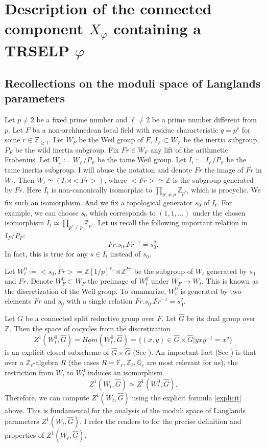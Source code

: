 \documentclass{article}
\begin{document}
	
	\section{Description of the connected component $X_{\varphi}$ containing a TRSELP $\varphi$}
	
	\subsection{Recollections on the moduli space of Langlands parameters}
	
	Let $p \neq 2$ be a fixed prime number and $\ell \neq 2$ be a prime number different from $p$. Let $F$ ba a non-archimedean local field with residue characteristic $q=p^r$ for some $r \in \mathbb{Z}_{\geq 1}$. Let $W_F$ be the Weil group of $F$, $I_F \subset W_F$ be the inertia subgroup, $P_F$ be the wild inertia subgroup. Fix $Fr \in W_F$ any lift of the arithmetic Frobenius. Let $W_t:=W_F/P_F$ be the tame Weil group. Let $I_t:=I_F/P_F$ be the tame inertia subgroup. I will abuse the notation and denote $Fr$ the image of $Fr$ in $W_t$. Then $W_t \simeq (I_t \rtimes <Fr>)$, where $<Fr> \simeq \mathbb{Z}$ is the subgroup generated by $Fr$. Here $I_t$ is non-canonically isomorphic to $\prod_{p'\neq p}\mathbb{Z}_{p'}$, which is procyclic. We fix such an isomorphism. And we fix a topological generator $s_0$ of $I_t$. For example, we can choose $s_0$ which corresponds to $(1, 1, ...)$ under the chosen isomorphism $I_t \simeq \prod_{p'\neq p}\mathbb{Z}_{p'}$. Let us recall the following important relation in $I_F/P_F$:
	$$Fr.s_0.Fr^{-1}=s_0^q.$$
	In fact, this is true for any $s \in I_t$ instead of $s_0$.
	
	Let $W_t^0:=<s_0, Fr>=\mathbb{Z}[1/p]^{s_0} \rtimes \mathbb{Z}^{Fr}$ be the subgroup of $W_t$ generated by $s_0$ and $Fr$. Denote $W_F^0 \subset W_F$ the preimage of $W_t^0$ under $W_F \to W_t$. This is known as the discretization of the Weil group. To summarize, $W_t^0$ is generated by two elements $Fr$ and $s_0$ with a single relation $Fr.s_0.Fr^{-1}=s_0^q$. 
	
	Let $G$ be a connected split reductive group over $F$. Let $\hat{G}$ be its dual group over $\mathbb{Z}$. Then the space of cocycles from the discretization
	\begin{equation}\label{explicit}
		Z^1(W_t^0, \hat{G})=\underline{Hom}(W_t^0, \hat{G})=\{(x, y) \in \hat{G} \times \hat{G} | yxy^{-1}=x^q\}
	\end{equation}
	is an explicit closed subscheme of $\hat{G} \times \hat{G}$ (See \cite[Section 3]{dat2022ihes}). An important fact (See \cite[Proposition 3.9]{dat2022ihes}) is that over a $\mathbb{Z}_{\ell}$-algebra $R$ (the cases $R=\overline{\mathbb{F}_{\ell}}, \overline{\mathbb{Z}_{\ell}}, \overline{\mathbb{Q}_{\ell}}$ are most relevant for us), the restriction from $W_t$ to $W_t^0$ induces an isomorphism
	$$Z^1(W_t, \hat{G}) \simeq Z^1(W_t^0, \hat{G}).$$ 
	Therefore, we can compute $Z^1(W_t, \hat{G})$ using the explicit formula \ref{explicit} above. This is fundamental for the analysis of the moduli space of Langlands parameters $Z^1(W_t, \hat{G})$. I refer the readers to \cite[Section 3 and Section 4]{dat2022ihes} for the precise definition and properties of $Z^1(W_t, \hat{G})$. 
	
\end{document}
